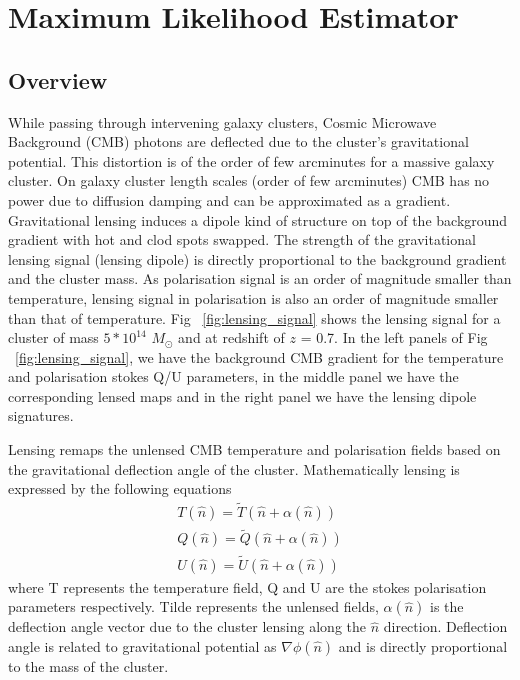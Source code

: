 \chapter{Maximum Likelihood Estimator}
\label{ch:MLE}
\section{Overview}
While passing through intervening galaxy clusters, Cosmic Microwave Background (CMB) photons are deflected due to the cluster's gravitational potential. 
This distortion is of the order of few arcminutes for a massive galaxy cluster.
On galaxy cluster length scales (order of few arcminutes) CMB has no power due to diffusion damping \citep{silk96} and can be approximated as a gradient. 
Gravitational lensing induces a dipole kind of structure on top of the background gradient with hot and clod spots swapped. 
The strength of the gravitational lensing signal (lensing dipole) is directly proportional to the background gradient and the cluster mass. 
As polarisation signal is an order of magnitude smaller than temperature, lensing signal in polarisation is also an order of magnitude smaller than that of temperature. 
Fig ~\ref{fig:lensing_signal} shows the lensing signal for a cluster of mass $5*10^{14}$ $M_{\odot}$ and at redshift of $z$ = 0.7.
In  the left panels of Fig ~\ref{fig:lensing_signal}, we have the background CMB gradient for the temperature and polarisation stokes Q/U parameters, in the middle panel we have the corresponding lensed maps and in the right panel we have the lensing dipole signatures.

Lensing remaps the unlensed CMB temperature and polarisation fields based on the gravitational deflection angle of the cluster. 
Mathematically lensing is expressed by the following equations
\begin{eqnarray}
T(\hat{n}) = \tilde{T}(\hat{n} + \alpha(\hat{n}))\\
Q(\hat{n}) = \tilde{Q}(\hat{n} + \alpha(\hat{n}))\\
U(\hat{n}) =  \tilde{U}(\hat{n} + \alpha(\hat{n}))
\end{eqnarray}
where T represents the temperature field, Q and U are the stokes polarisation parameters respectively. 
Tilde represents the unlensed fields, $\alpha(\hat{n})$ is the deflection angle vector due to the cluster lensing along the $\hat{n}$ direction. 
Deflection angle is related to gravitational potential as $\nabla \phi (\hat{n})$ and is directly proportional to the mass of the cluster.

